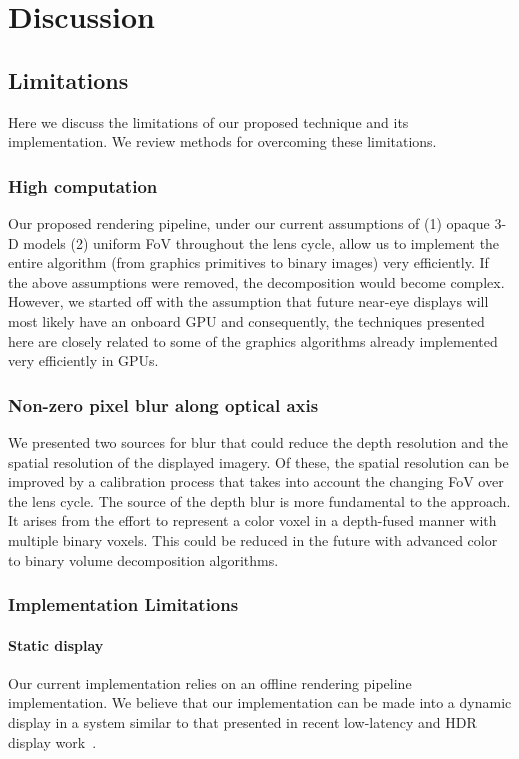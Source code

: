 \section{Discussion}
\label{sec:volumetric:discussion}
\subsection{Limitations}

Here we discuss the limitations of our proposed technique and its implementation. We review methods for overcoming these limitations.

\subsubsection{High computation}
Our proposed rendering pipeline, under our current assumptions of (1) opaque 3-D models (2) uniform FoV throughout the lens cycle, allow us to implement the entire algorithm (from graphics primitives to binary images) very efficiently. If the above assumptions were removed, the decomposition would become complex. However, we started off with the assumption that future near-eye displays will most likely have an onboard GPU and consequently, the techniques presented here are closely related to some of the graphics algorithms already implemented very efficiently in GPUs.

\subsubsection{Non-zero pixel blur along optical axis}
We presented two sources for blur that could reduce the depth resolution and the spatial resolution of the displayed imagery. Of these, the spatial resolution can be improved by a calibration process that takes into account the changing FoV over the lens cycle. The source of the depth blur is more fundamental to the approach. It arises from the effort to represent a color voxel in a depth-fused manner with multiple binary voxels. This could be reduced in the future with advanced color to binary volume decomposition algorithms.

\subsubsection{Implementation Limitations}
\paragraph{Static display} Our current implementation relies on an offline rendering pipeline implementation. We believe that our implementation can be made into a dynamic display in a system similar to that presented in recent low-latency and HDR display work~\cite{Lincoln2016motion,Lincoln2017scene}.

